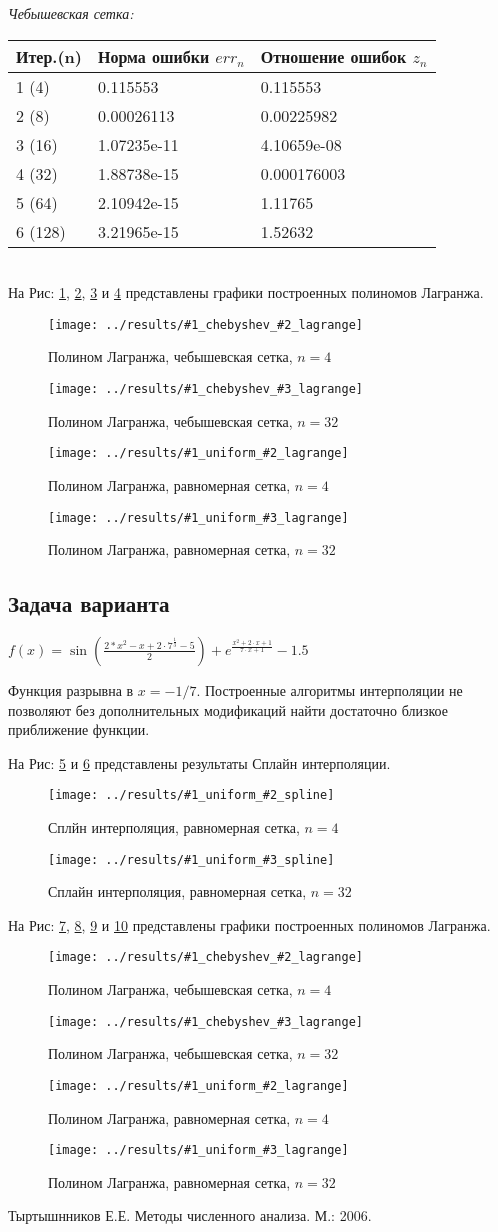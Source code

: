 \documentclass[12pt]{article}
\newcommand{\lagrange}[3] {
	На Рис: \ref{fig:#1chebyshev#2lagrange},  \ref{fig:#1chebyshev#3lagrange}, \ref{fig:#1uniform#2lagrange} и \ref{fig:#1uniform#3lagrange}
	представлены графики построенных полиномов Лагранжа.
	
	\begin{figure}[H]
		\centering
		\texttt{[image: ../results/\#1\_chebyshev\_\#2\_lagrange]}
		\caption{Полином Лагранжа, чебышевская сетка, $n = #2$}
		\label{fig:#1chebyshev#2lagrange}
	\end{figure}
	\begin{figure}[H]
		\centering
		\texttt{[image: ../results/\#1\_chebyshev\_\#3\_lagrange]}
		\caption{Полином Лагранжа, чебышевская сетка, $n = #3$}
		\label{fig:#1chebyshev#3lagrange}
	\end{figure}
	\begin{figure}[H]
		\centering
		\texttt{[image: ../results/\#1\_uniform\_\#2\_lagrange]}
		\caption{Полином Лагранжа, равномерная сетка, $n = #2$}
		\label{fig:#1uniform#2lagrange}
	\end{figure}
	\begin{figure}[H]
		\centering
		\texttt{[image: ../results/\#1\_uniform\_\#3\_lagrange]}
		\caption{Полином Лагранжа, равномерная сетка, $n = #3$}
		\label{fig:#1uniform#3lagrange}
	\end{figure}
}
\newcommand{\spline}[3] {
	На Рис:  \ref{fig:#1uniform#2spline} и \ref{fig:#1uniform#3spline} представлены результаты Сплайн интерполяции.
	
	\begin{figure}[H]
		\centering
		\texttt{[image: ../results/\#1\_uniform\_\#2\_spline]}
		\caption{Сплйн интерполяция, равномерная сетка, $n = #2$}
		\label{fig:#1uniform#2spline}
	\end{figure}
	\begin{figure}[H]
		\centering
		\texttt{[image: ../results/\#1\_uniform\_\#3\_spline]}
		\caption{Сплайн интерполяция, равномерная сетка, $n = #3$}
		\label{fig:#1uniform#3spline}
	\end{figure}
}
\begin{document}
\textit{Чебышевская сетка:}\\


\begin{tabular}{|l|l|l|}
	\hline 
	Итер.(n) & Норма ошибки $err_n$ &  Отношение ошибок $z_n$ \\ \hline
	1 (4)  &  0.115553 & 0.115553 \\ \hline
	2 (8)  &  0.00026113 & 0.00225982  \\ \hline
	3 (16)  & 1.07235e-11 & 4.10659e-08  \\ \hline
	4 (32)  &  1.88738e-15 & 0.000176003  \\ \hline
	5 (64)  &  2.10942e-15 & 1.11765 \\ \hline
	6 (128)  & 3.21965e-15 & 1.52632  \\ \hline
\end{tabular}\\

\lagrange{sin1}{4}{32}

\subsection{Задача варианта}
$f(x) = \sin(\frac{2 * x^2 - x + 2 \cdot 7^{\frac{1}{3}} - 5}{2}) + e^{\frac{x^2 + 2 \cdot x + 1}{7 \cdot x + 1}} - 1.5$

Функция разрывна в $x = -1/7$. Построенные алгоритмы интерполяции не позволяют без дополнительных модификаций найти достаточно близкое приближение функции.

\spline{target}{4}{32}
\lagrange{target}{4}{32}

\begin{thebibliography}{3}
Тыртышнников Е.Е. Методы численного анализа. М.: 2006.
	
\end{thebibliography}
\end{document}

